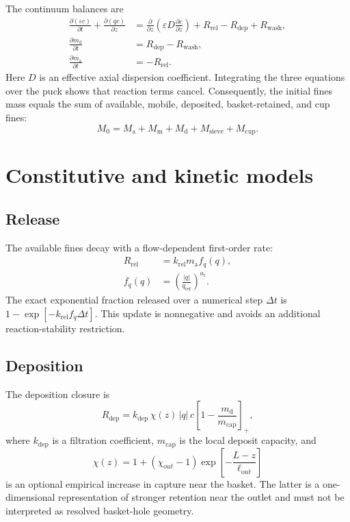 \documentclass[11pt,a4paper]{article}
\newcommand{\pos}[1]{\left[#1\right]_+}
\begin{document}
The continuum balances are
\begin{align}
 \frac{\partial(\varepsilon c)}{\partial t}
 +\frac{\partial(qc)}{\partial z}
 &=\frac{\partial}{\partial z}\!\left(\varepsilon D
 \frac{\partial c}{\partial z}\right)
 +R_{\mathrm{rel}}-R_{\mathrm{dep}}+R_{\mathrm{wash}}, \label{eq:mobile}\\
 \frac{\partial m_{\mathrm d}}{\partial t}
 &=R_{\mathrm{dep}}-R_{\mathrm{wash}}, \label{eq:deposit}\\
 \frac{\partial m_{\mathrm a}}{\partial t}
 &=-R_{\mathrm{rel}}. \label{eq:available}
\end{align}
Here $D$ is an effective axial dispersion coefficient. Integrating the three
equations over the puck shows that reaction terms cancel. Consequently, the
initial fines mass equals the sum of available, mobile, deposited, basket-retained,
and cup fines:
\begin{equation}
M_0=M_{\mathrm a}+M_{\mathrm m}+M_{\mathrm d}
 +M_{\mathrm{sieve}}+M_{\mathrm{cup}}. \label{eq:globalmass}
\end{equation}

\section{Constitutive and kinetic models}

\subsection{Release}

The available fines decay with a flow-dependent first-order rate:
\begin{align}
 R_{\mathrm{rel}}&=k_{\mathrm{rel}}m_{\mathrm a}f_q(q),\\
 f_q(q)&=\left(\frac{|q|}{q_{\mathrm{ref}}}\right)^{a_{\mathrm r}}.
\end{align}
The exact exponential fraction released over a numerical step $\Delta t$ is
$1-\exp[-k_{\mathrm{rel}}f_q\Delta t]$. This update is nonnegative and avoids
an additional reaction-stability restriction.

\subsection{Deposition}

The deposition closure is
\begin{equation}
 R_{\mathrm{dep}}=k_{\mathrm{dep}}\,\chi(z)\,|q|\,c
 \pos{1-\frac{m_{\mathrm d}}{m_{\mathrm{cap}}}}, \label{eq:deposition}
\end{equation}
where $k_{\mathrm{dep}}$ is a filtration coefficient, $m_{\mathrm{cap}}$ is
the local deposit capacity, and
\begin{equation}
\chi(z)=1+(\chi_{\mathrm out}-1)
\exp\!\left[-\frac{L-z}{\ell_{\mathrm out}}\right]
\end{equation}
is an optional empirical increase in capture near the basket. The latter is a
one-dimensional representation of stronger retention near the outlet and must
not be interpreted as resolved basket-hole geometry.
\end{document}
